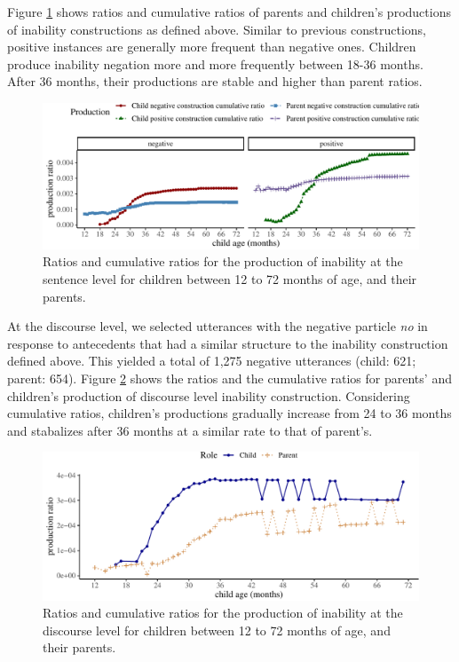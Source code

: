 \documentclass[
  english,
  man,floatsintext]{apa6}
\begin{document}
Figure \ref{fig:inability} shows ratios and cumulative ratios of parents and children's productions of inability constructions as defined above. Similar to previous constructions, positive instances are generally more frequent than negative ones. Children produce inability negation more and more frequently between 18-36 months. After 36 months, their productions are stable and higher than parent ratios.

\begin{figure}[H]

{\centering \includegraphics{neg_construction_article_files/figure-latex/inability-1} 

}

\caption{Ratios and cumulative ratios for the production of inability at the sentence level for children between 12 to 72 months of age, and their parents.}\label{fig:inability}
\end{figure}

At the discourse level, we selected utterances with the negative particle \emph{no} in response to antecedents that had a similar structure to the inability construction defined above. This yielded a total of 1,275 negative utterances (child: 621; parent: 654). Figure \ref{fig:inabilitydiscourse} shows the ratios and the cumulative ratios for parents' and children's production of discourse level inability construction. Considering cumulative ratios, children's productions gradually increase from 24 to 36 months and stabalizes after 36 months at a similar rate to that of parent's.

\begin{figure}[H]

{\centering \includegraphics{neg_construction_article_files/figure-latex/inabilitydiscourse-1} 

}

\caption{Ratios and cumulative ratios for the production of inability at the discourse level for children between 12 to 72 months of age, and their parents.}\label{fig:inabilitydiscourse}
\end{figure}
\end{document}
